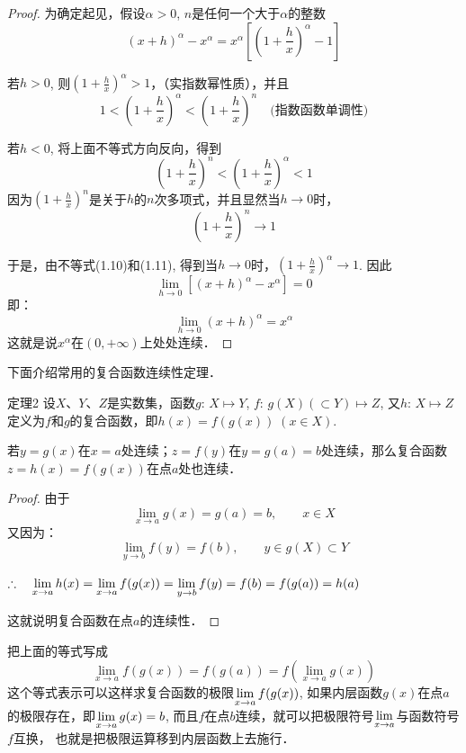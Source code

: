 \begin{proof}
为确定起见，假设$\alpha>0$, $n$是任何一个大于$\alpha$的整数
\[(x+h)^{\alpha} -x^{\alpha}=x^{\alpha} \left[ \left(1+\frac{h}{x}\right)^{\alpha} -1\right] \]

若$h>0$, 则$\left(1+\frac{h}{x}\right)^{\alpha} >1$，（实指数幂性质），并且
\begin{equation}
    1<\left(1+\frac{h}{x}\right)^{\alpha}<\left(1+\frac{h}{x}\right)^{n}\quad \text{(指数函数单调性)}
\end{equation}

若$h<0$, 将上面不等式方向反向，得到
\begin{equation}
    \left(1+\frac{h}{x}\right)^{n}<\left(1+\frac{h}{x}\right)^{\alpha}<1
\end{equation}
因为$\left(1+\frac{h}{x}\right)^{n}$是关于$h$的$n$次多项式，并且显然当$h\to 0$时，
\[\left(1+\frac{h}{x}\right)^{n}\to 1\]

于是，由不等式(1.10)和(1.11), 得到当$h\to 0$时，$\left(1+\frac{h}{x}\right)^{\alpha}\to 1$. 因此
\[\lim_{h\to 0}\left[(x+h)^{\alpha}-x^{\alpha}\right]=0\]
即：
\[\lim_{h\to 0}(x+h)^{\alpha}=x^{\alpha}\]
这就是说$x^{\alpha}$在$(0,+\infty)$上处处连续．
\end{proof}

下面介绍常用的复合函数连续性定理．
\begin{blk}
{定理2} 设$X$、$Y$、$Z$是实数集，函数$g:\,X\mapsto Y$, $f:\, g(X)(\subset Y)\mapsto Z$, 又$h:\, X\mapsto Z$定义为$f$和$g$的复合函数，即$h(x)=f (g (x) )\;  (x\in X)$.

若$y=g(x)$在$x=a$处连续；$z=f(y)$在$y=g(a)=b$处连续，那么复合函数$z=h(x)=f(g(x))$在点$a$处也连续．
\end{blk}

\begin{proof}
由于
\begin{equation}
    \lim_{x\to a} g(x)=g(a)=b,\qquad x\in X
\end{equation}    
又因为：
\begin{equation}
    \lim_{y\to b} f(y)=f(b),\qquad y\in g(X)\subset Y
\end{equation}

$\therefore\quad \displaystyle\lim_{x\to a}h(x)=\displaystyle\lim_{x\to a}f(g(x))=\displaystyle\lim_{y\to b}f(y)=f(b)=f(g(a))=h(a)$

这就说明复合函数在点$a$的连续性．
\end{proof}

把上面的等式写成
\[\lim_{x\to a}f (g (x) ) =f (g (a) ) =f \left(\lim_{x\to a} g(x) \right)\]
这个等式表示可以这样求复合函数的极限$\displaystyle\lim_{x\to a}f(g(x))$, 
如果内层函数$g(x)$在点$a$的极限存在，即$\displaystyle\lim_{x\to a}g(x)=b$, 
而且$f$在点$b$连续，就可以把极限符号$\displaystyle\lim_{x\to a}$与函数符号$f$互换，
也就是把极限运算移到内层函数上去施行．

